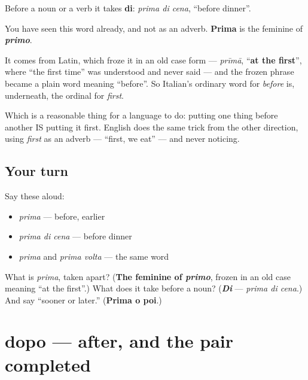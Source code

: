Before a noun or a verb it takes \textbf{di}: \emph{prima di cena}, \textquotedblleft{}before dinner\textquotedblright{}.

\begin{cousinweb}
You have seen this word already, and not as an adverb. \textbf{Prima} is the feminine of \emph{\textbf{primo}}.

It comes from Latin, which froze it in an old case form — \emph{prīmā}, \textquotedblleft{}\textbf{at the first}\textquotedblright{}, where \textquotedblleft{}the first time\textquotedblright{} was understood and never said — and the frozen phrase became a plain word meaning \textquotedblleft{}before\textquotedblright{}. So Italian's ordinary word for \emph{before} is, underneath, the ordinal for \emph{first}.

Which is a reasonable thing for a language to do: putting one thing before another IS putting it first. English does the same trick from the other direction, using \emph{first} as an adverb — \textquotedblleft{}first, we eat\textquotedblright{} — and never noticing.
\end{cousinweb}

\subsection*{Your turn}
Say these aloud:

\begin{itemize}
\raggedright
  \item \emph{prima} — before, earlier
  \item \emph{prima di cena} — before dinner
  \item \emph{prima} and \emph{prima volta} — the same word
\end{itemize}

\begin{tcolorbox}[breakable,colback=teal!4,colframe=teal!35!black,title={Before you move on}]
What is \emph{prima}, taken apart? (\textbf{The feminine of \emph{primo}}, frozen in an old case meaning \textquotedblleft{}at the first\textquotedblright{}.) What does it take before a noun? (\emph{\textbf{Di}} — \emph{prima di cena}.) And say \textquotedblleft{}sooner or later.\textquotedblright{} (\textbf{Prima o poi}.)
\end{tcolorbox}
\section[dopo]{dopo — after, and the pair completed}

